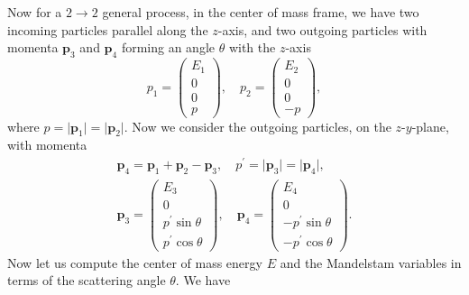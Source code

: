 Now for a \(2 \to  2\) general process, in the center of mass frame, we have two incoming particles parallel along the \(z\)-axis, and two outgoing particles with momenta \(\mathbf{p}_3\) and \(\mathbf{p}_4\) forming an angle \(\theta\) with the \(z\)-axis
\[
    p_1 = \begin{pmatrix}
        E_1 \\
        0   \\
        0   \\
        p
    \end{pmatrix}, \quad p_2 = \begin{pmatrix}
        E_2 \\
        0   \\
        0   \\
        -p
    \end{pmatrix},
\]
where \(p = \vert \mathbf{p}_1 \vert = \vert \mathbf{p}_2 \vert \). Now we consider the outgoing particles, on the \(z\)-\(y\)-plane, with momenta
\[
    \begin{aligned}
        \mathbf{p}_4 = \mathbf{p}_1 + \mathbf{p}_2 - \mathbf{p}_3, \quad p^{\prime} = \vert \mathbf{p}_3 \vert = \vert \mathbf{p}_4 \vert, \\
        \mathbf{p}_3 = \begin{pmatrix}
                           E_3                    \\
                           0                      \\
                           p^{\prime} \sin \theta \\
                           p^{\prime} \cos \theta
                       \end{pmatrix}, \quad \mathbf{p}_4 = \begin{pmatrix}
                                                               E_4                     \\
                                                               0                       \\
                                                               -p^{\prime} \sin \theta \\
                                                               -p^{\prime} \cos \theta
                                                           \end{pmatrix}.
    \end{aligned}
\]
Now let us compute the center of mass energy \(E\) and the Mandelstam variables in terms of the scattering angle \(\theta\). We have
